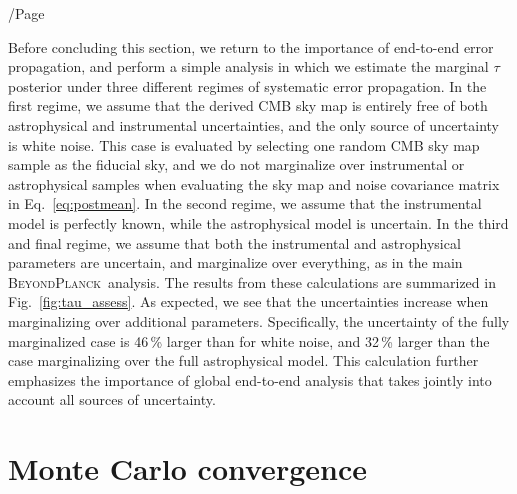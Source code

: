 /Page\documentclass[twocolumn]{aa}
\newcommand{\BP}{\textsc{BeyondPlanck}}
\begin{document}
Before concluding this section, we return to the importance of
end-to-end error propagation, and perform a simple analysis in which
we estimate the marginal $\tau$ posterior under three different regimes
of systematic error propagation. In the first regime, we
assume that the derived CMB sky map is entirely free of both
astrophysical and instrumental uncertainties, and the only source of
uncertainty is white noise. This case is evaluated by selecting one
random CMB sky map sample as the fiducial sky, and we do not
marginalize over instrumental or astrophysical samples when evaluating
the sky map and noise covariance matrix in Eq.~\eqref{eq:postmean}. In the second
regime, we assume that the instrumental model is perfectly known,
while the astrophysical model is uncertain. In the third and final
regime, we assume that both the instrumental and astrophysical
parameters are uncertain, and marginalize over everything, as in the
main \BP\ analysis. The results from these calculations are summarized
in Fig.~\ref{fig:tau_assess}. As expected, we see that the
uncertainties increase when marginalizing over additional
parameters. Specifically, the uncertainty of the fully marginalized
case is 46\,\% larger than for white noise, and 32\,\% larger than the
case marginalizing over the full astrophysical model. This calculation
further emphasizes the importance of global end-to-end analysis that
takes jointly into account all sources of uncertainty. 


\section{Monte Carlo convergence}
\label{sec:convergence}
\end{document}
